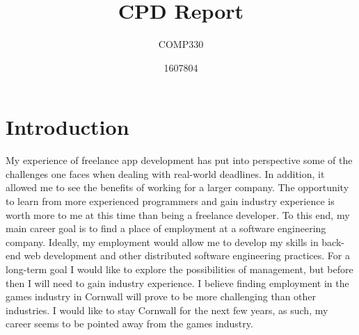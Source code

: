 \documentclass{scrartcl}
\title{CPD Report}
\subtitle{COMP330}
\author{1607804}
\begin{document}
\maketitle

\section{Introduction}
My experience of freelance app development has put into perspective some of the challenges one faces when dealing with real-world deadlines. In addition, it allowed me to see the benefits of working for a larger company. The opportunity to learn from more experienced programmers and gain industry experience is worth more to me at this time than being a freelance developer. To this end, my main career goal is to find a place of employment at a software engineering company. Ideally, my employment would allow me to develop my skills in back-end web development and other distributed software engineering practices. For a long-term goal I would like to explore the possibilities of management, but before then I will need to gain industry experience. I believe finding employment in the games industry in Cornwall will prove to be more challenging than other industries. I would like to stay Cornwall for the next few years, as such, my career seems to be pointed away from the games industry.
\end{document}
